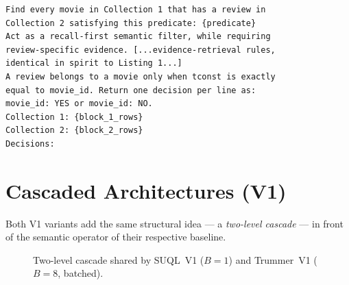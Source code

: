 \documentclass[sigconf,natbib=false]{acmart}
\begin{document}
\begin{lstlisting}[style=prompt, caption={Block-join prompt, verbatim from \texttt{operators.py} (Trummer baseline).}, label={lst:trummer-prompt}]
Find every movie in Collection 1 that has a review in
Collection 2 satisfying this predicate: {predicate}
Act as a recall-first semantic filter, while requiring
review-specific evidence. [...evidence-retrieval rules,
identical in spirit to Listing 1...]
A review belongs to a movie only when tconst is exactly
equal to movie_id. Return one decision per line as:
movie_id: YES or movie_id: NO.
Collection 1: {block_1_rows}
Collection 2: {block_2_rows}
Decisions:
\end{lstlisting}

\section{Cascaded Architectures (V1)}
\label{sec:cascade}

Both V1 variants add the same structural idea --- a \emph{two-level cascade} --- in front of the semantic operator of their respective baseline.

\begin{figure}[t]
\centering
{}
\caption{Two-level cascade shared by SUQL~V1 ($B{=}1$) and Trummer~V1 ($B{=}8$, batched).}
\label{fig:cascade}
\end{figure}
\end{document}
